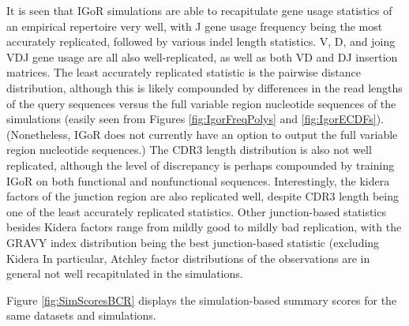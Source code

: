 \documentclass{article}
\begin{document}
It is seen that IGoR simulations are able to recapitulate gene usage statistics of an empirical repertoire very well, with J gene usage frequency being the most accurately replicated, followed by various indel length statistics.
V, D, and joing VDJ gene usage are all also well-replicated, as well as both VD and DJ insertion matrices.
The least accurately replicated statistic is the pairwise distance distribution, although this is likely compounded by differences in the read lengths of the query sequences versus the full variable region nucleotide sequences of the simulations (easily seen from Figures \ref{fig:IgorFreqPolys} and \ref{fig:IgorECDFs}).
(Nonetheless, IGoR does not currently have an option to output the full variable region nucleotide sequences.)
The CDR3 length distribution is also not well replicated, although the level of discrepancy is perhaps compounded by training IGoR on both functional and nonfunctional sequences.
Interestingly, the kidera factors of the junction region are also replicated well, despite CDR3 length being one of the least accurately replicated statistics.
Other junction-based statistics besides Kidera factors range from mildly good to mildly bad replication, with the GRAVY index distribution being the best junction-based statistic (excluding Kidera
In particular, Atchley factor distributions of the observations are in general not well recapitulated in the simulations.

Figure \ref{fig:SimScoresBCR} displays the simulation-based summary scores for the same datasets and simulations.
\end{document}
